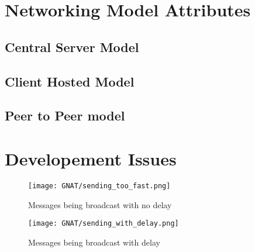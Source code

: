 \chapter{Networking Model Attributes}\label{app:attributes}

\section{Central Server Model}

\newpage

\section{Client Hosted Model}

\newpage

\section{Peer to Peer model}


\chapter{Developement Issues}
\begin{figure}[!h]
  \centering
  \texttt{[image: GNAT/sending\_too\_fast.png]}
  \caption{Messages being broadcast with no delay}
  \label{fig:broadcast_too_fast}
\end{figure}

\begin{figure}[!h]
  \centering
  \texttt{[image: GNAT/sending\_with\_delay.png]}
  \caption{Messages being broadcast with delay}
  \label{fig:broadcast_with_delay}
\end{figure}
